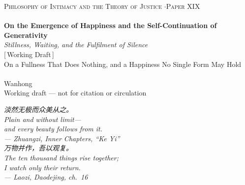 \documentclass[11pt,a4paper]{article}
\begin{document}
\thispagestyle{empty}
\begin{center}
\vspace*{2cm}
{\footnotesize\color{rosedeep}\scshape Philosophy of Intimacy and the Theory of Justice \quad$\cdot$\quad Paper XIX}\\[0.3cm]
\coverrule\\[1.2cm]
{\LARGE\bfseries\color{warnred} On the Emergence of Happiness and the Self-Continuation of Generativity}\\[0.7cm]
{\large\itshape\color{warnred} Stillness, Waiting, and the Fulfilment of Silence}\\[0.8cm]
{\small\color{gold} [\,Working Draft\,]}\\[0.8cm]
{\normalsize\color{inksoft} On a Fullness That Does Nothing, and a Happiness No Single Form May Hold}\\[2cm]
\coverrule[0.25]\\[0.6cm]
{\normalsize\color{inksoft} Wanhong}\\
\vfill
{\footnotesize\color{gold} Working draft --- not for citation or circulation}
\coverfootnote
\end{center}
\newpage

\thispagestyle{empty}
\vspace*{2.4cm}
\begin{center}
\begin{minipage}{0.74\linewidth}
\centering\itshape\color{rose}
{\cjk 淡然无极而众美从之。}\\[0.3em]
Plain and without limit---\\[0.15em]
and every beauty follows from it.\\[0.6em]
{\upshape\footnotesize\color{gold} --- Zhuangzi, \emph{Inner Chapters}, ``Ke Yi''}\\[1.2em]
\itshape
{\cjk 万物并作，吾以观复。}\\[0.3em]
The ten thousand things rise together;\\[0.15em]
I watch only their return.\\[0.6em]
{\upshape\footnotesize\color{gold} --- Laozi, \emph{Daodejing}, ch.~16}
\end{minipage}
\end{center}
\newpage
\end{document}
